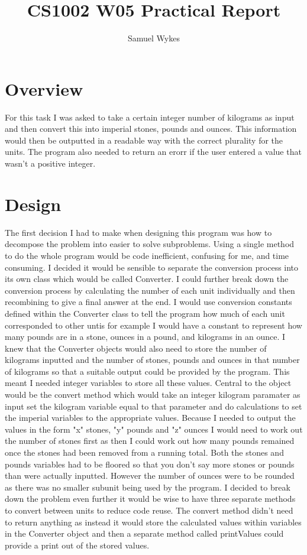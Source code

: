 \documentclass[a4paper]{article}
\title{CS1002 W05 Practical Report}
\author{Samuel Wykes}
\begin{document}
\maketitle
\section*{Overview}
For this task I was asked to take a certain integer number of kilograms as input and then convert this into imperial stones, pounds and ounces. This 
information would then be outputted in a readable way with the correct plurality for the units. The program also needed to return an erorr if the user 
entered a value that wasn't a positive integer.
\section*{Design}
The first decision I had to make when designing this program was how to decompose the problem into easier to solve subproblems. Using a single method 
to do the whole program would be code inefficient, confusing for me, and time consuming. I decided it would be sensible to separate the conversion 
process into its own class which would be called Converter. I could further break down the conversion process by calculating the number of each unit 
individually and then recombining to give a final answer at the end. I would use conversion constants defined within the Converter class to tell the 
program how much of each unit corresponded to other untis for example I would have a constant to represent how many pounds are in a stone, ounces in a 
pound, and kilograms in an ounce. I knew that the Converter objects would also need to store the number of kilograms inputted and the number of 
stones, pounds and ounces in that number of kilograms so that a suitable output could be provided by the program. This meant I needed integer 
variables to store all these values. Central to the object would be the convert method which would take an integer kilogram paramater as input set the 
kilogram variable equal to that parameter and do calculations to set the imperial variables to the appropriate values. Because I needed to output the 
values in the form "x" stones, "y" pounds and "z" ounces I would need to work out the number of stones first as then I could work out how many pounds 
remained once the stones had been removed from a running total. Both the stones and pounds variables had to be floored so that you don't say more 
stones or pounds than were actually inputted. However the number of ounces were to be rounded as there was no smaller subunit being used by the 
program. I decided to break down the problem even further it would be wise to have three separate methods to convert between units to reduce code 
reuse. The convert method didn't need to return anything as instead it would store the calculated values within variables in the Converter object and 
then a separate method called printValues could provide a print out of the stored values.
\end{document}
